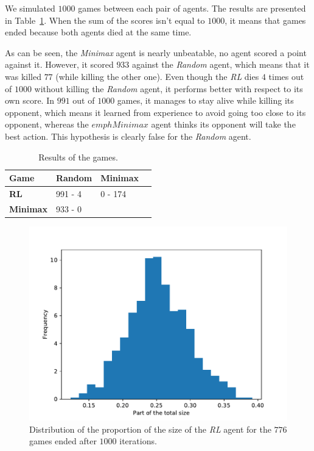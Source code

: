 \documentclass[journal, a4paper]{IEEEtran}
\begin{document}
We simulated $1000$ games between each pair of agents.
The results are presented in Table~\ref{comparative_table}.
When the sum of the scores isn't equal to $1000$, it means that games ended because both agents died at the same time.

As can be seen, the \emph{Minimax} agent is nearly unbeatable, no agent scored a point against it.
However, it scored $933$ against the \emph{Random} agent, which means that it was killed $77$ (while killing the other one).
Even though the \emph{RL} dies $4$ times out of $1000$ without killing the \emph{Random} agent, it performs better with respect to its own score.
In $991$ out of $1000$ games, it manages to stay alive while killing its opponent, which means it learned from experience to avoid going too close to its opponent, whereas the $emph{Minimax}$ agent thinks its opponent will take the best action.
This hypothesis is clearly false for the \emph{Random} agent.

\begin{table}[h]
	\caption{\label{comparative_table}Results of the games.}
	\centering
	\begin{tabular}{llll}
		\hline
        \textbf{Game} & \textbf{Random} & \textbf{Minimax}  \\
		\hline
        \textbf{RL} & 991 - 4 & 0 - 174 \\
        \textbf{Minimax} & 933 - 0 &  \\
		\hline
	\end{tabular}
\end{table}

\begin{figure}[h]
	\centering
    \includegraphics[width=0.95\columnwidth]{images/histo_size.pdf}
    \caption{\label{histo_size}Distribution of the proportion of the size of the \emph{RL} agent for the $776$ games ended after $1000$ iterations.}
\end{figure}
\end{document}
